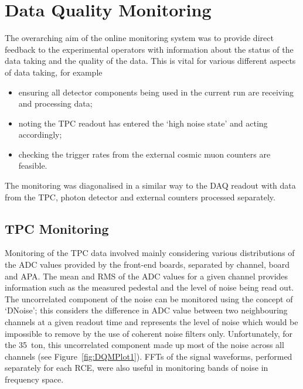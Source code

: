 \section{Data Quality Monitoring}\label{sec:DQM}

The overarching aim of the online monitoring system was to provide direct feedback to the experimental operators with information about the status of the data taking and the quality of the data.  This is vital for various different aspects of data taking, for example
\begin{itemize}
\item ensuring all detector components being used in the current run are receiving and processing data;
\item noting the TPC readout has entered the `high noise state' and acting accordingly;
\item checking the trigger rates from the external cosmic muon counters are feasible.
\end{itemize}

The monitoring was diagonalised in a similar way to the DAQ readout with data from the TPC, photon detector and external counters processed separately.

\subsection{TPC Monitoring}\label{sec:TPCMonitoring}

Monitoring of the TPC data involved mainly considering various distributions of the ADC values provided by the front-end boards, separated by channel, board and APA.  The mean and RMS of the ADC values for a given channel provides information such as the measured pedestal and the level of noise being read out.  The uncorrelated component of the noise can be monitored using the concept of `DNoise'; this considers the difference in ADC value between two neighbouring channels at a given readout time and represents the level of noise which would be impossible to remove by the use of coherent noise filters only.  Unfortunately, for the 35~ton, this uncorrelated component made up most of the noise across all channels (see Figure~\ref{fig:DQMPlot1}).  FFTs of the signal waveforms, performed separately for each RCE, were also useful in monitoring bands of noise in frequency space.

